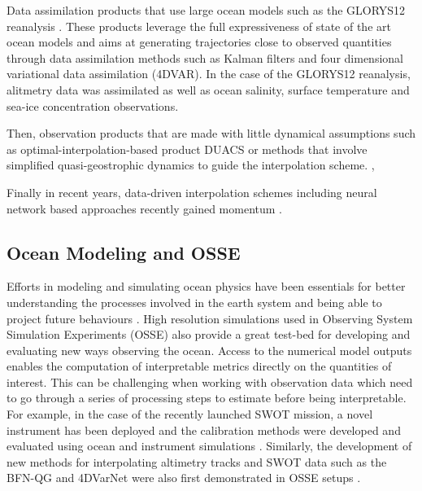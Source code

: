 \documentclass[draft]{agujournal2019}
\begin{document}
Data assimilation products that use large ocean models such as the GLORYS12 reanalysis \cite{jean-michelCopernicusGlobal122021}. These products leverage the full expressiveness of state of the art ocean models and aims at generating trajectories close to observed quantities through data assimilation methods such as Kalman filters and four dimensional variational data assimilation (4DVAR)\cite{carrassiDataAssimilationGeosciences2018}. In the case of the GLORYS12 reanalysis, alitmetry data was assimilated as well as ocean salinity, surface temperature and sea-ice concentration observations.

Then, observation products that are made with little dynamical assumptions such as optimal-interpolation-based product DUACS \cite{taburetDUACSDT2018252019} or methods that involve simplified quasi-geostrophic dynamics to guide the interpolation scheme. \cite{guillouMappingAltimetryForthcoming2021},\cite{ballarottaDynamicMappingAlongTrack2020}

Finally in recent years, data-driven interpolation schemes including neural network based approaches recently gained momentum \cite{alveraazcarateReconstructionIncompleteOceanographic2005,fabletENDTOENDPHYSICSINFORMEDREPRESENTATION2021,ubelmannReconstructingOceanSurface2021}.



\subsection{Ocean Modeling and OSSE}
\label{ssec:oceanmodeling}
Efforts in modeling and simulating ocean physics have been essentials for better understanding the processes involved in the earth system and being able to project future behaviours \cite{bernardImpactPartialSteps2006,ajayiSpatialTemporalVariability2020}. 
High resolution simulations used in Observing System Simulation Experiments (OSSE) also provide a great test-bed for developing and evaluating new ways observing the ocean.
Access to the numerical model outputs enables the computation of interpretable metrics directly on the quantities of interest. This can be challenging when working with observation data which need to go through a series of processing steps to estimate before being interpretable.
For example, in the case of the recently launched SWOT mission, a novel instrument has been deployed and the calibration methods were developed and evaluated using ocean and instrument simulations \cite{dibarboureDataDrivenCalibrationAlgorithm2022}.
Similarly, the development of new methods for interpolating altimetry tracks and SWOT data such as the BFN-QG and 4DVarNet were also first demonstrated in OSSE setups \cite{guillouMappingAltimetryForthcoming2021,fabletENDTOENDPHYSICSINFORMEDREPRESENTATION2021}. 
\end{document}
